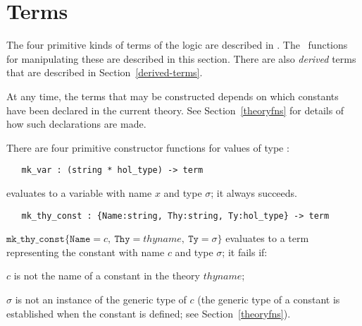 \section{Terms}\label{sec:system-terms}

The four primitive kinds of terms of the logic are described in
\LOGIC.  The \ML\ functions for manipulating these are described in
this section. There are also \emph{derived} terms that are described
in Section~\ref{derived-terms}.

At any time, the terms that may be constructed depends on which
constants have been declared in the current theory. See
Section~\ref{theoryfns} for details of how such declarations are made.

There are four primitive constructor
functions for values of type :

\begin{holboxed}
\begin{verbatim}
   mk_var : (string * hol_type) -> term
\end{verbatim}
\end{holboxed}

\noindent{} evaluates to a variable
with name $x$ and type $\sigma$; it always succeeds.

\begin{holboxed}
\begin{verbatim}
   mk_thy_const : {Name:string, Thy:string, Ty:hol_type} -> term
\end{verbatim}
\end{holboxed}

\noindent $\mathtt{mk\_thy\_const}\{\mathtt{Name} = \mathit{c},\
\mathtt{Thy} = \mathit{thyname},\ \mathtt{Ty} = \sigma\}$
 evaluates to a term representing the constant
with name $c$ and type $\sigma$; it fails if:
\begin{myenumerate}
\item $c$ is not the name of a constant in the theory $\mathit{thyname}$;
\item $\sigma$ is not an instance of the generic type of $c$
(the generic type of a constant is established when the constant is defined;
see Section~\ref{theoryfns}).
\end{myenumerate}

